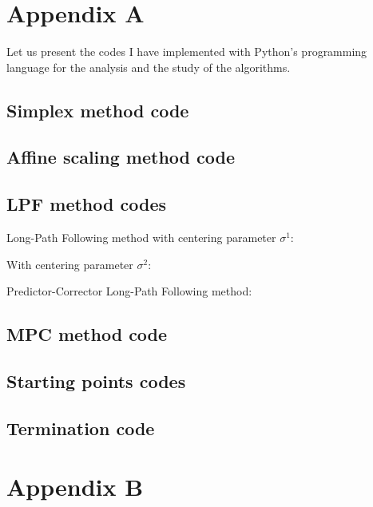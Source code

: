 \documentclass[a4paper,10 pt,titlepage,twoside]{book}
\theoremstyle{plain}
\theoremstyle{definition}
\theoremstyle{remark}
\begin{document}
\chapter{Appendix A}	
 Let us present the codes I have implemented with Python's programming language for the analysis and the study of the algorithms.
 \section*{Simplex method code}\label{app:A.1}
 
 \section*{Affine scaling method code}
 
 \section*{LPF method codes}
 Long-Path Following method with centering parameter $\sigma^{1}$:
 
With centering parameter $\sigma^{2}$:
 
Predictor-Corrector Long-Path Following method: 
 
\section*{MPC method code}

\newpage
\section*{Starting points codes}
 
 
\section*{Termination code}
 
	\chapter*{Appendix B}
\end{document}
